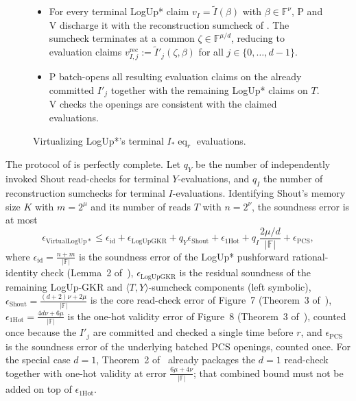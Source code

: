 \begin{figure}[!htbp]
\begin{framed}
\begin{itemize}
\item
For every terminal LogUp* claim $v_I=\widetilde{I}(\beta)$ with $\beta\in\mathbb{F}^\nu$,
P and V discharge it with the reconstruction sumcheck of .
The sumcheck terminates at a common $\zeta\in\mathbb{F}^{\mu/d}$,
reducing to evaluation claims
$v^{\mathrm{rec}}_{I,j}:=\widetilde{I}'_j(\zeta,\beta)$
for all $j\in\{0,\ldots,d-1\}$.

\item
P batch-opens all resulting evaluation claims on the already committed $I'_j$
together with the remaining LogUp* claims on $T$.
V checks the openings are consistent with the claimed evaluations.
\end{itemize}
\end{framed}
\caption{Virtualizing LogUp*'s terminal $I_*\operatorname{eq}_r$ evaluations.}
\label{fig:protocol}
\end{figure}

\begin{theorem}\label{thm:soundness}
The protocol of  is perfectly complete.
Let $q_Y$ be the number of independently invoked Shout read-checks for terminal $Y$-evaluations,
and $q_I$ the number of reconstruction sumchecks for terminal $I$-evaluations.
Identifying Shout's memory size $K$ with $m=2^\mu$ and its number of reads $T$ with $n=2^\nu$,
the soundness error is at most
\[
\epsilon_{\mathrm{VirtualLogUp*}}
\le
\epsilon_{\mathrm{id}}
+
\epsilon_{\mathrm{LogUpGKR}}
+
q_Y\epsilon_{\mathrm{Shout}}
+
\epsilon_{\mathrm{1Hot}}
+
q_I\frac{2\mu/d}{|\mathbb{F}|}
+
\epsilon_{\mathrm{PCS}},
\]
where
$\epsilon_{\mathrm{id}}=\frac{n+m}{|\mathbb{F}|}$
is the soundness error of the LogUp* pushforward rational-identity check
(Lemma~2 of~\cite{cryptoeprint:2025/946}),
$\epsilon_{\mathrm{LogUpGKR}}$ is the residual soundness of the remaining LogUp-GKR and
$\langle T,Y\rangle$-sumcheck components (left symbolic),
$\epsilon_{\mathrm{Shout}}=\frac{(d+2)\nu+2\mu}{|\mathbb{F}|}$
is the core read-check error of Figure~7
(Theorem~3 of~\cite{cryptoeprint:2025/105}),
$\epsilon_{\mathrm{1Hot}}=\frac{4d\nu+6\mu}{|\mathbb{F}|}$
is the one-hot validity error of Figure~8
(Theorem~3 of~\cite{cryptoeprint:2025/105}),
counted once because the $I'_j$ are committed and checked a single time before $r$,
and $\epsilon_{\mathrm{PCS}}$ is the soundness error of the underlying batched PCS openings, counted once.
For the special case $d=1$, Theorem~2 of~\cite{cryptoeprint:2025/105} already packages the $d=1$ read-check together with one-hot validity at error $\frac{6\mu+4\nu}{|\mathbb{F}|}$;
that combined bound must not be added on top of $\epsilon_{\mathrm{1Hot}}$.
\end{theorem}

